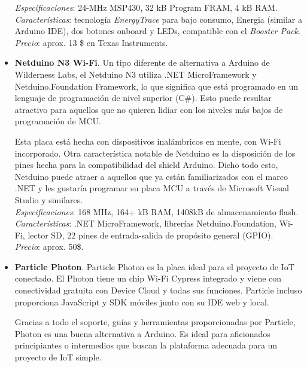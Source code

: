 \documentclass[12pt]{article}
\begin{document}
\begin{itemize}
		\textit{Especificaciones}: 24-MHz MSP430, 32 kB Program FRAM, 4 kB RAM. \\
		
		\textit{Características}: tecnología \textit{EnergyTrace} para bajo consumo, Energia (similar a Arduino IDE), dos botones onboard y LEDs, compatible con el \textit{Booster Pack}. \\
		
		\textit{Precio}: aprox. 13 \$ en Texas Instruments. \\
		
		\item \textbf{Netduino N3 Wi-Fi}. Un tipo diferente de alternativa a Arduino de Wilderness Labs, el Netduino N3 utiliza .NET MicroFramework y Netduino.Foundation Framework, lo que significa que está programado en un lenguaje de programación de nivel superior (C\#). Esto puede resultar atractivo para aquellos que no quieren lidiar con los niveles más bajos de programación de MCU.
		
		Esta placa está hecha con dispositivos inalámbricos en mente, con Wi-Fi incorporado. Otra característica notable de Netduino es la disposición de los pines hecha para la compatibilidad del shield Arduino. Dicho todo esto, Netduino puede atraer a aquellos que ya están familiarizados con el marco .NET y les gustaría programar su placa MCU a través de Microsoft Visual Studio y similares. \\
		
		\textit{Especificaciones}: 168 MHz, 164+ kB RAM, 1408kB de almacenamiento flash.  \\
		
		\textit{Características}: .NET  MicroFramework, librerías Netduino.Foundation, Wi-Fi, lector SD,  22 pines de entrada-salida de propósito general (GPIO). \\
		
		\textit{Precio}: aprox. 50\$. \\
		
		\item \textbf{Particle Photon}. Particle Photon es la placa ideal para el proyecto de IoT conectado. El Photon tiene un chip Wi-Fi Cypress integrado y viene con conectividad gratuita con Device Cloud y todas sus funciones. Particle incluso proporciona JavaScript y SDK móviles junto con su IDE web y local.
		
		Gracias a todo el soporte, guías y herramientas proporcionadas por Particle, Photon es una buena alternativa a Arduino. Es ideal para aficionados principiantes o intermedios que buscan la plataforma adecuada para un proyecto de IoT simple. \\
		

\end{itemize}
\end{document}
